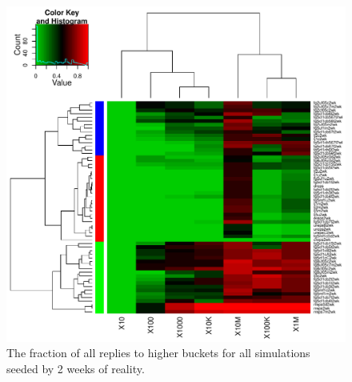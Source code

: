 \documentclass[10pt,oneside]{memoir}
\begin{document}
\begin{Spacing}{2}
\begin{figure}
\begin{center}
    \includegraphics{figures/crop/heatmap-b2br-befr-rel-medians-2wk}
    \caption{The fraction of all replies to higher buckets for all simulations seeded by 2 weeks of reality.}
    \label{figure:heatmap-b2br-befr-rel-medians-2wk}
\end{center}
\end{figure}


\end{Spacing}
\end{document}
